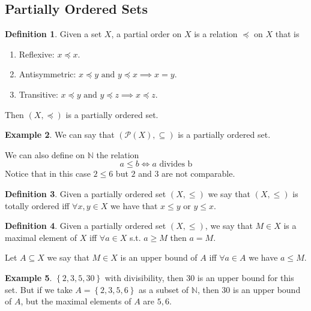 \documentclass[11pt,a4paper]{article}
\theoremstyle{definition}
\newtheorem{definition}{Definition}[section]
\newtheorem{example}[definition]{Example}
\theoremstyle{plain}
\theoremstyle{remark}
\newcommand{\N}{\mathbb{N}}
\renewcommand{\set}[1]{\left\{ #1 \right\}}
\newcommand{\1}{\mathbbm{1}}
\begin{document}
\subsection{Partially Ordered Sets} 

\begin{definition}
    Given a set $X$, a partial order on $X$ is a relation $\preceq$ on $X$ that is 
    \begin{enumerate}[label = \roman*)]
        \item Reflexive: $x \preceq x$. 
        \item Antisymmetric: $x \preceq y \text{ and } y \preceq x \implies x = y$. 
        \item Transitive: $x \preceq y \text{ and } y \preceq z \implies x \preceq z$.
    \end{enumerate}
    Then $(X, \preceq)$ is a partially ordered set.
\end{definition}

\begin{example}
    We can say that $(\mathcal{P}(X), \subseteq)$ is a partially ordered set.
    
    We can also define on $\N$ the relation 
    $$a \le b \iff a \text{ divides b}$$
    Notice that in this case $2 \le 6$ but $2$ and $3$ are not comparable.
\end{example}

\begin{definition}
    Given a partially ordered set $(X, \le)$ we say that $(X, \le)$ is totally ordered iff $\forall x, y \in X$ we have that 
    $x \le y \text{ or } y \le x$.
\end{definition}

\begin{definition}
    Given a partially ordered set $(X, \le)$, we say that $M \in X$ is a maximal element of $X$ iff 
    $\forall a \in X$ s.t. $a \ge M$ then $a = M$. 

    Let $A \subseteq X$ we say that $M \in X$ is an upper bound of $A$ iff $\forall a \in A$ we have 
    $a \le M$.  
\end{definition}

\begin{example}
    $\set{2,3,5, 30}$ with divisibility, then $30$ is an upper bound for this set. But if we take $A  =\set{2,3,5,6}$ as a subset of $\N$, then $30$ 
    is an upper bound of $A$, but the maximal elements of $A$ are $5,6$. 
\end{example}
\end{document}
